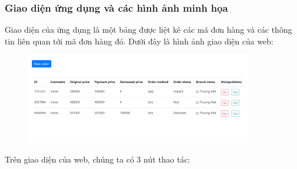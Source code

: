 \documentclass[13pt,a4paper]{article}
\begin{document}
	\subsubsection{Giao diện ứng dụng và các hình ảnh minh họa}
	Giao diện của ứng dụng là một bảng được liệt kê các mã đơn hàng và các thông tin liên quan tới mã đơn hàng đó. Dưới đây là hình ảnh giao diện của web:
	\begin{figure}[h!]
		\begin{center}
			\includegraphics[width=10cm]{vitran/web_interface.png}
		\end{center}
	\end{figure}
	Trên giao diện của web, chúng ta có 3 nút thao tác:
\end{document}
